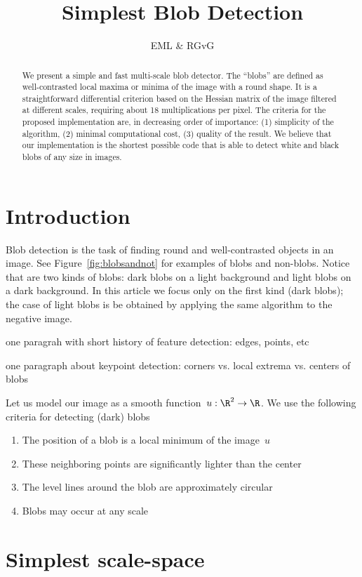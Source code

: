 \documentclass[a4paper]{article}
\title{Simplest Blob Detection}
\author{EML \& RGvG}
\begin{document}
\maketitle
\begin{abstract}
	We present a simple and fast multi-scale blob detector.
	The ``blobs'' are defined as well-contrasted local maxima or minima of
	the image with a round shape.
	It is a straightforward differential criterion based on the Hessian
	matrix of the image filtered at different scales, requiring about 18
	multiplications per pixel.
	The criteria for the proposed implementation are, in decreasing order
	of importance: (1) simplicity of the algorithm, (2) minimal
	computational cost, (3) quality of the result.
	We believe that our implementation is the shortest possible code that
	is able to detect white and black blobs of any size in images.
\end{abstract}

\section{Introduction}

Blob detection is the task of finding round and well-contrasted objects in an
image.  See Figure~\ref{fig:blobsandnot} for examples of blobs and non-blobs.
Notice that are two kinds of blobs: dark blobs on a light background and light
blobs on a dark background.  In this article we focus only on the first kind
(dark blobs); the case of light blobs is be obtained by applying the same
algorithm to the negative image.

one paragrah with short history of feature detection: edges, points, etc

one paragraph about keypoint detection: corners vs. local extrema vs. centers
of blobs

Let us model our image as a smooth function~$u:\R^2\to\R$.
We use the following criteria for detecting (dark) blobs 
\begin{enumerate}
	\item The position of a blob is a local minimum of the image~$u$
	\item These neighboring points are significantly lighter than the center
	\item The level lines around the blob are approximately circular
	\item Blobs may occur at any scale
\end{enumerate}

\section{Simplest scale-space}
\end{document}
